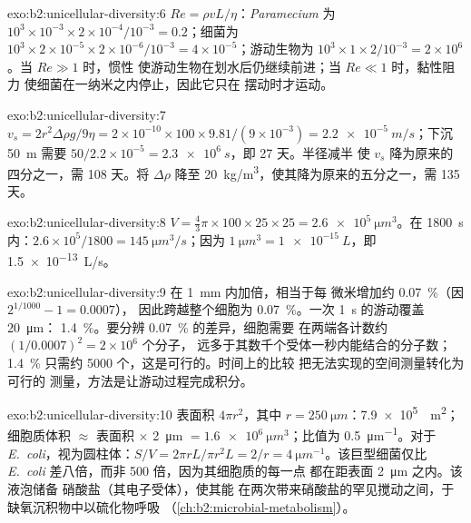 \begin{solution}{exo:b2:unicellular-diversity:6}
$Re = \rho vL/\eta$：\emph{Paramecium} 为 $10^3\times 10^{-3}\times
2\times 10^{-4}/10^{-3} = 0.2$；细菌为 $10^3\times 2\times
10^{-5}\times 2\times 10^{-6}/10^{-3} = 4\times 10^{-5}$；游动生物为
$10^3\times 1\times 2/10^{-3} = 2\times 10^6$。当 $Re \gg 1$ 时，惯性
使游动生物在划水后仍继续前进；当 $Re \ll 1$ 时，黏性阻力
使细菌在一纳米之内停止，因此它只在
摆动时才运动。
\end{solution}

\begin{solution}{exo:b2:unicellular-diversity:7}
$v_s = 2r^2\Delta\rho g/9\eta = 2\times 10^{-10}\times 100\times
9.81/(9\times 10^{-3}) = \qty{2.2e-5}{m/s}$；下沉 \qty{50}{m} 需要
$50/2.2\times 10^{-5} = \qty{2.3e6}{s}$，即 27 天。半径减半
使 $v_s$ 降为原来的四分之一，需 108 天。将 $\Delta\rho$ 降至
\qty{20}{kg/m^3}，使其降为原来的五分之一，需 135 天。
\end{solution}

\begin{solution}{exo:b2:unicellular-diversity:8}
$V = \tfrac{4}{3}\pi\times 100\times 25\times 25 =
\qty{2.6e5}{\micro m^3}$。在 \qty{1800}{s} 内：$2.6\times 10^5/1800 =
\qty{145}{\micro m^3/s}$；因为 $\qty{1}{\micro m^3} =
\qty{1e-15}{L}$，即 \qty{1.5e-13}{L/s}。
\end{solution}

\begin{solution}{exo:b2:unicellular-diversity:9}
在 \qty{1}{mm} 内加倍，相当于每
微米增加约 \qty{0.07}{\%}（因 $2^{1/1000} - 1 = 0.0007$），
因此跨越整个细胞为 \qty{0.07}{\%}。一次 \qty{1}{s} 的游动覆盖 \qty{20}{\micro m}：
\qty{1.4}{\%}。要分辨 \qty{0.07}{\%} 的差异，细胞需要
在两端各计数约 $(1/0.0007)^2 = 2\times 10^6$ 个分子，
远多于其数千个受体一秒内能结合的分子数；
\qty{1.4}{\%} 只需约 \num{5000} 个，这是可行的。时间上的比较
把无法实现的空间测量转化为可行的
测量，方法是让游动过程完成积分。
\end{solution}

\begin{solution}{exo:b2:unicellular-diversity:10}
表面积 $4\pi r^2$，其中 $r = \qty{250}{\micro m}$：\qty{7.9e5}{\micro
m^2}；细胞质体积 $\approx$ 表面积 $\times$ \qty{2}{\micro m}
$= \qty{1.6e6}{\micro m^3}$；比值为 \qty{0.5}{\micro m^{-1}}。对于
\emph{E.~coli}，视为圆柱体：$S/V = 2\pi r L/\pi r^2 L = 2/r =
\qty{4}{\micro m^{-1}}$。该巨型细菌仅比
\emph{E.~coli} 差八倍，而非 500 倍，因为其细胞质的每一点
都在距表面 \qty{2}{\micro m} 之内。该液泡储备
硝酸盐（其电子受体），使其能
在两次带来硝酸盐的罕见搅动之间，于缺氧沉积物中以硫化物呼吸
（\cref{ch:b2:microbial-metabolism}）。
\end{solution}

